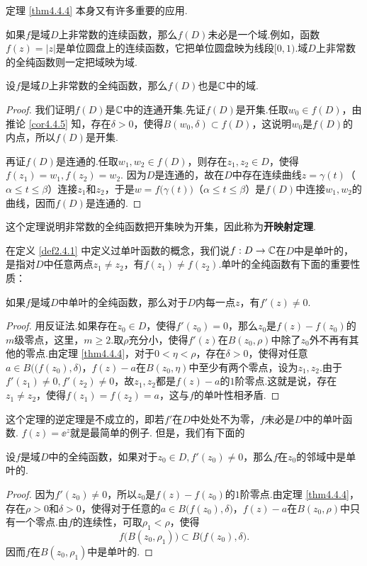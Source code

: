 定理 \ref{thm4.4.4} 本身又有许多重要的应用.

如果$f$是域$D$上非常数的连续函数，那么$f(D)$未必是一个域.例如，函数$f(z)=|z|$是单位圆盘上的连续函数，它把单位圆盘映为线段$[0,1)$.域$D$上非常数的全纯函数则一定把域映为域.

\begin{theorem}\label{thm4.4.6}
设$f$是域$D$上非常数的全纯函数，那么$f(D)$也是$\mathbb C$中的域.
\end{theorem}
\begin{proof}
我们证明$f(D)$是$\mathbb C$中的连通开集.先证$f(D)$是开集.任取$w_0\in f(D)$，由推论 \ref{cor4.4.5} 知，存在$\delta>0$，使得$B(w_0,\delta)\subset f(D)$，这说明$w_0$是$f(D)$的内点，所以$f(D)$是开集.

再证$f(D)$是连通的.任取$w_1,w_2\in f(D)$，则存在$z_1,z_2\in D$，使得$f(z_1)=w_1,f(z_2)=w_2$. 因为$D$是连通的，故在$D$中存在连续曲线$z=\gamma(t)$（$\alpha\le t\le \beta$）连接$z_1$和$z_2$，于是$w=f\big(\gamma(t)\big)$（$\alpha\le t\le \beta$）是$f(D)$中连接$w_1,w_2$的曲线，因而$f(D)$是连通的.
\end{proof}

这个定理说明非常数的全纯函数把开集映为开集，因此称为\textbf{开映射定理}.

在定义 \ref{def2.4.1} 中定义过单叶函数的概念，我们说$f:D\to\mathbb C$在$D$中是单叶的，是指对$D$中任意两点$z_1\ne z_2$，有$f(z_1)\ne f(z_2)$.单叶的全纯函数有下面的重要性质：
\begin{theorem}\label{thm4.4.7}
如果$f$是域$D$中单叶的全纯函数，那么对于$D$内每一点$z$，有$f'(z)\ne0$.
\end{theorem}
\begin{proof}
用反证法.如果存在$z_0\in D$，使得$f'(z_0)=0$，那么$z_0$是$f(z)-f(z_0)$的$m$级零点，这里，$m\ge2$.取$\rho$充分小，使得$f'(z)$在$B(z_0,\rho)$中除了$z_0$外不再有其他的零点.由定理 \ref{thm4.4.4}，对于$0<\eta<\rho$，存在$\delta>0$，使得对任意$a\in B\big((f(z_0),\delta\big)$，$f(z)-a$在$B(z_0,\eta)$中至少有两个零点，设为$z_1,z_2$.由于$f'(z_1)\ne0,f'(z_2)\ne0$，故$z_1,z_2$都是$f(z)-a$的$1$阶零点.这就是说，存在$z_1\ne z_2$，使得$f(z_1)=f(z_2)=a$，这与$f$的单叶性相矛盾.
\end{proof}

这个定理的逆定理是不成立的，即若$f'$在$D$中处处不为零，$f$未必是$D$中的单叶函数. $f(z)=\ee^z$就是最简单的例子. 但是，我们有下面的
\begin{theorem}\label{thm4.4.8}
设$f$是域$D$中的全纯函数，如果对于$z_0\in D,f'(z_0)\ne0$，那么$f$在$z_0$的邻域中是单叶的.
\end{theorem}
\begin{proof}
因为$f'(z_0)\ne0$，所以$z_0$是$f(z)-f(z_0)$的$1$阶零点.由定理 \ref{thm4.4.4}，存在$\rho>0$和$\delta>0$，使得对于任意的$a\in B\big(f(z_0),\delta\big)$，$f(z)-a$在$B(z_0,\rho)$中只有一个零点.由$f$的连续性，可取$\rho_1<\rho$，使得
\[f\big(B(z_0,\rho_1)\big)\subset B\big(f(z_0),\delta\big).\]
因而$f$在$B(z_0,\rho_1)$中是单叶的.
\end{proof}

